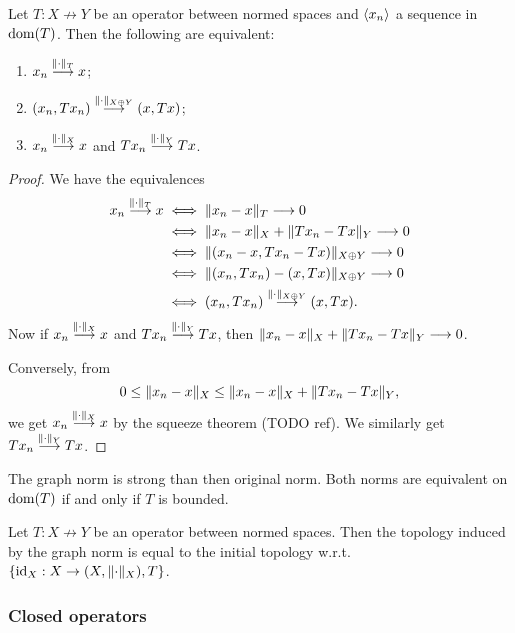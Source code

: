 \begin{lemma} \label{graphNormConvergenceLemma}
Let $T: X\not\to Y$ be an operator between normed spaces and $\left\langle x_n \right\rangle$ a sequence in $\operatorname{dom}(T)$. Then the following are equivalent:
\begin{enumerate}
\item $x_n \overset{\lVert\cdot\rVert_T}{\longrightarrow} x$;
\item $(x_n, Tx_n) \overset{\lVert\cdot\rVert_{X\oplus Y}}{\longrightarrow} (x, Tx)$;
\item $x_n\overset{\lVert\cdot\rVert_X}{\longrightarrow} x$ and $Tx_n\overset{\lVert\cdot\rVert_Y}{\longrightarrow} Tx$.
\end{enumerate}
\end{lemma}
\begin{proof}
We have the equivalences
\begin{align*}
x_n \overset{\lVert\cdot\rVert_T}{\longrightarrow} x &\iff \lVert x_n - x\rVert_T \longrightarrow 0 \\
&\iff \lVert x_n - x\rVert_X + \lVert Tx_n - Tx\rVert_Y \longrightarrow 0 \\
&\iff \lVert(x_n - x, Tx_n - Tx)\rVert_{X\oplus Y} \longrightarrow 0 \\
&\iff \lVert(x_n, Tx_n) - (x, Tx)\rVert_{X\oplus Y} \longrightarrow 0 \\
&\iff (x_n, Tx_n) \overset{\lVert\cdot\rVert_{X\oplus Y}}{\longrightarrow} (x, Tx).
\end{align*}
Now if $x_n\overset{\lVert\cdot\rVert_X}{\longrightarrow} x$ and $Tx_n\overset{\lVert\cdot\rVert_Y}{\longrightarrow} Tx$, then $\lVert x_n - x\rVert_X + \lVert Tx_n - Tx\rVert_Y \longrightarrow 0$. 

Conversely, from
\[ 0 \leq \lVert x_n - x\rVert_X\leq \lVert x_n - x\rVert_X + \lVert Tx_n - Tx\rVert_Y, \]
we get $x_n\overset{\lVert\cdot\rVert_X}{\longrightarrow} x$ by the squeeze theorem (TODO ref). We similarly get $Tx_n\overset{\lVert\cdot\rVert_Y}{\longrightarrow} Tx$.
\end{proof}
\begin{corollary}
The graph norm is strong than then original norm. Both norms are equivalent on $\operatorname{dom}(T)$ \textup{if and only if} $T$ is bounded.
\end{corollary}
\begin{corollary}
Let $T: X\not\to Y$ be an operator between normed spaces. Then the topology induced by the graph norm is equal to the initial topology w.r.t. $\{\id_X: X\to \sSet{X,\norm{\cdot}_X}, T\}$.
\end{corollary}

\subsubsection{Closed operators}

